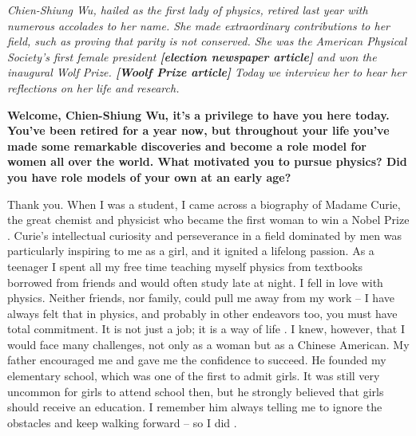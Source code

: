 \documentclass{article}
\date{NOVEMBER 29, 1982}
\begin{document}
\maketitle

\begin{multicols}{2}


\textit{Chien-Shiung Wu, hailed as the first lady of physics, retired last year with numerous accolades to her name. She made extraordinary contributions to her field, such as proving that parity is not conserved. She was the American Physical Society’s first female president \textbf{[election newspaper article]} and won the inaugural Wolf Prize. \textbf{[Woolf Prize article]} Today we interview her to hear her reflections on her life and research.}

\vspace{10pt}

\begin{window}[10,r,\texttt{[image: \{"./images/wu-columbia"]}.png},
\textit{\footnotesize Chien-Shiung Wu in 1963 at Columbia University}
]
\textbf{Welcome, Chien-Shiung Wu, it’s a privilege to have you here today. You’ve been retired for a year now, but throughout your life you’ve made some remarkable discoveries and become a role model for women all over the world. What motivated you to pursue physics? Did you have role models of your own at an early age? }
\vspace{5pt}

Thank you. When I was a student, I came across a biography of Madame Curie, the great chemist and physicist who became the first woman to win a Nobel Prize \cite{L1}. Curie’s intellectual curiosity and perseverance in a field dominated by men was particularly inspiring to me as a girl, and it ignited a lifelong passion. As a teenager I spent all my free time teaching myself physics from textbooks borrowed from friends and would often study late at night. I fell in love with physics. Neither friends, nor family, could pull me away from my work – I have always felt that in physics, and probably in other endeavors too, you must have total commitment. It is not just a job; it is a way of life \cite{L2}. I knew, however, that I would face many challenges, not only as a woman but as a Chinese American. My father encouraged me and gave me the confidence to succeed. He founded my elementary school, which was one of the first to admit girls. It was still very uncommon for girls to attend school then, but he strongly believed that girls should receive an education. I remember him always telling me to ignore the obstacles and keep walking forward – so I did\cite{L3} .
\end{window}


\end{multicols}
\end{document}
